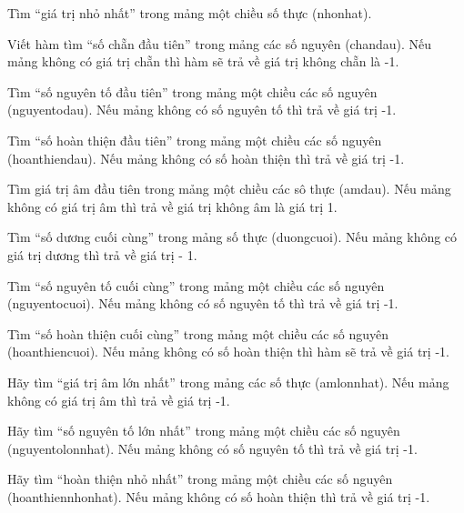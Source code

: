 \begin{problem}
    Tìm “giá trị nhỏ nhất” trong mảng một chiều số thực (nhonhat).
\end{problem}
\begin{problem}
    Viết hàm tìm “số chẵn đầu tiên” trong mảng các số nguyên (chandau). Nếu mảng không có giá trị chẵn thì hàm sẽ trả về giá trị không chẵn là -1.
\end{problem}
\begin{problem}
    Tìm “số nguyên tố đầu tiên” trong mảng một chiều các số nguyên (nguyentodau). Nếu mảng không có số nguyên tố thì trả về giá trị -1.
\end{problem}
\begin{problem}
    Tìm “số hoàn thiện đầu tiên” trong mảng một chiều các số nguyên (hoanthiendau). Nếu mảng không có số hoàn thiện thì trả về giá trị -1.
\end{problem}
\begin{problem}
    Tìm giá trị âm đầu tiên trong mảng một chiều các sô thực (amdau). Nếu mảng không có giá trị âm thì trả về giá trị không âm là giá trị 1.
\end{problem}
\begin{problem}
    Tìm “số dương cuối cùng” trong mảng số thực (duongcuoi). Nếu mảng không có giá trị dương thì trả về giá trị - 1.
\end{problem}
\begin{problem}
    Tìm “số nguyên tố cuối cùng” trong mảng một chiều các số nguyên (nguyentocuoi). Nếu mảng không có số nguyên tố thì trả về giá trị -1.
\end{problem}
\begin{problem}
    Tìm “số hoàn thiện cuối cùng” trong mảng một chiều các số nguyên (hoanthiencuoi). Nếu mảng không có số hoàn thiện thì hàm sẽ trả về giá trị -1.
\end{problem}
\begin{problem}
    Hãy tìm “giá trị âm lớn nhất” trong mảng các số thực (amlonnhat). Nếu mảng không có giá trị âm thì trả về giá trị -1.
\end{problem}
\begin{problem}
    Hãy tìm “số nguyên tố lớn nhất” trong mảng một chiều các số nguyên (nguyentolonnhat). Nếu mảng không có số nguyên tố thì trả về giá trị -1.
\end{problem}
\begin{problem}
    Hãy tìm “hoàn thiện nhỏ nhất” trong mảng một chiều các số nguyên (hoanthiennhonhat). Nếu mảng không có số hoàn thiện thì trả về giá trị -1.
\end{problem}
